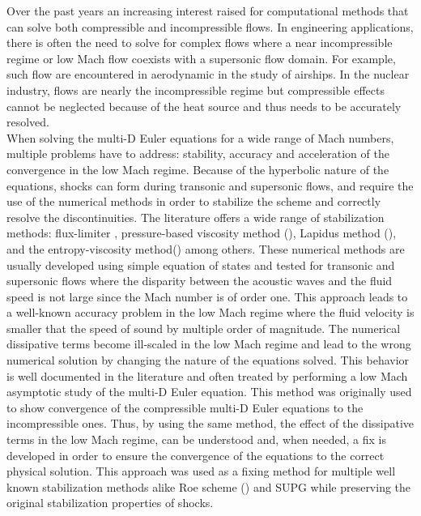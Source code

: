 \documentclass[preprint,10pt]{elsarticle}
\begin{document}
Over the past years an increasing interest raised for computational methods that can solve both compressible and incompressible flows. In engineering applications, there is often the need to solve for complex flows where a near incompressible regime or low Mach flow coexists with a supersonic flow domain. For example, such flow are encountered in aerodynamic in the study of airships. In the nuclear industry, flows are nearly the incompressible regime but compressible effects cannot be neglected because of the heat source and thus needs to be accurately resolved. \\
When solving the multi-D Euler equations for a wide range of Mach numbers, multiple problems have to address: stability, accuracy and acceleration of the convergence in the low Mach regime. Because of the hyperbolic nature of the equations, shocks can form during transonic and supersonic flows, and require the use of the numerical methods in order to stabilize the scheme and correctly resolve the discontinuities. The literature offers a wide range of stabilization methods: flux-limiter \cite{FluxLimiter, FluxLimiter2}, pressure-based viscosity method (\cite{PBV_book}), Lapidus method (\cite{Lapidus_paper, LMP, Lapidus_book}), and the entropy-viscosity method(\cite{jlg1, jlg2}) among others. These numerical methods are usually developed using simple equation of states and tested for transonic and supersonic flows where the disparity between the acoustic waves and the fluid speed is not large since the Mach number is of order one. This approach leads to a well-known accuracy problem in the low Mach regime where the fluid velocity is smaller that the speed of sound by multiple order of magnitude. The numerical dissipative terms become ill-scaled in the low Mach regime and lead to the wrong numerical solution by changing the nature of the equations solved. This behavior is well documented in the literature \cite{LowMach1, LowMach2, LowMach3} and often treated by performing a low Mach asymptotic study of the multi-D Euler equation. This method was originally used \cite{LowMach1} to show convergence of the compressible multi-D Euler equations to the incompressible ones. Thus, by using the same method, the effect of the dissipative terms in the low Mach regime, can be understood and, when needed, a fix is developed in order to ensure the convergence of the equations to the correct physical solution. This approach was used as a fixing method for multiple well known stabilization methods alike Roe scheme (\cite{Roe}) and SUPG \cite{LowMach3} while preserving the original stabilization properties of shocks.  \\
\end{document}
